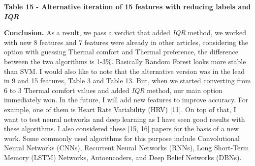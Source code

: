 {\bfseries Table 15 - Alternative iteration of 15 features with reducing
labels and \emph{IQR}}


{\bfseries Conclusion.} As a result, we pass a verdict that added
\emph{IQR} method, we worked with new 8 features and 7 features were
already in other articles, considering the option with guessing Thermal
comfort and Thermal preference, the difference between the two
algorithms is 1-3\%. Basically Random Forest looks more stable than SVM.
I would also like to note that the alternative version was in the lead
in 9 and 15 features, Table 3 and Table 13. But, when we started
converting from 6 to 3 Thermal comfort values and added \emph{IQR}
method, our main option immediately won. In the future, I will add new
features to improve accuracy. For example, one of them is Heart Rate
Variability (HRV) {[}11{]}. On top of that, I want to test neural
networks and deep learning as I have seen good results with these
algorithms. I also considered these {[}15, 16{]} papers for the basis of
a new work. Some commonly used algorithms for this purpose include
Convolutional Neural Networks (CNNs), Recurrent Neural Networks (RNNs),
Long Short-Term Memory (LSTM) Networks, Autoencoders, and Deep Belief
Networks (DBNs).

